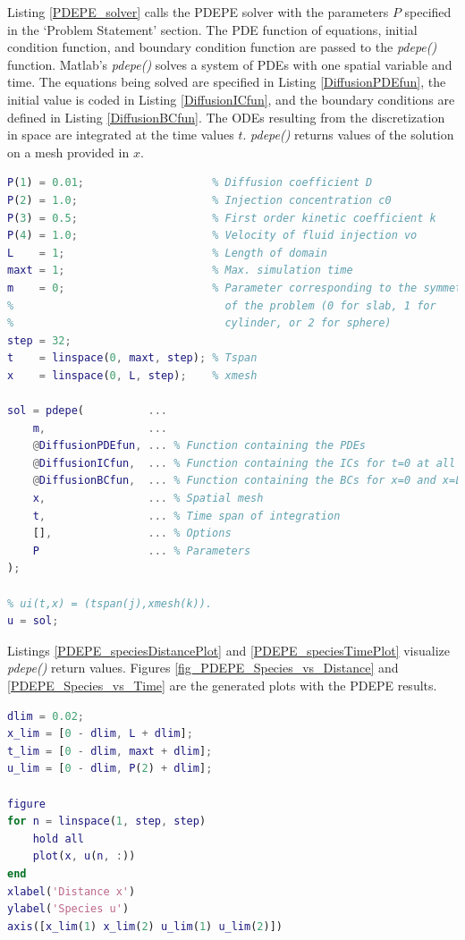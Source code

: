 \documentclass{article}
\begin{document}
Listing \ref{PDEPE_solver} calls the PDEPE solver with the parameters $P$ specified in the `Problem Statement' section. The PDE function of equations, initial condition function, and boundary condition function are passed to the \emph{pdepe()} function. Matlab's \emph{pdepe()} solves a system of PDEs with one spatial variable and time. The equations being solved are specified in Listing \ref{DiffusionPDEfun}, the initial value is coded in Listing \ref{DiffusionICfun}, and the boundary conditions are defined in Listing \ref{DiffusionBCfun}. The ODEs resulting from the discretization in space are integrated at the time values $t$. \emph{pdepe()} returns values of the solution on a mesh provided in $x$. 

\begin{lstlisting}[language=Matlab, caption=PDEPE solver, label=PDEPE_solver]
% Parameters
P(1) = 0.01;                    % Diffusion coefficient D
P(2) = 1.0;                     % Injection concentration c0
P(3) = 0.5;                     % First order kinetic coefficient k
P(4) = 1.0;                     % Velocity of fluid injection vo
L    = 1;                       % Length of domain
maxt = 1;                       % Max. simulation time
m    = 0;                       % Parameter corresponding to the symmetry
%                                 of the problem (0 for slab, 1 for
%                                 cylinder, or 2 for sphere)
step = 32;
t    = linspace(0, maxt, step); % Tspan
x    = linspace(0, L, step);    % xmesh

sol = pdepe(          ...
    m,                ...
    @DiffusionPDEfun, ... % Function containing the PDEs
    @DiffusionICfun,  ... % Function containing the ICs for t=0 at all x
    @DiffusionBCfun,  ... % Function containing the BCs for x=0 and x=L
    x,                ... % Spatial mesh
    t,                ... % Time span of integration
    [],               ... % Options
    P                 ... % Parameters
);

% ui(t,x) = (tspan(j),xmesh(k)).
u = sol;
\end{lstlisting}

Listings \ref{PDEPE_speciesDistancePlot} and \ref{PDEPE_speciesTimePlot} visualize \emph{pdepe()} return values. Figures \ref{fig_PDEPE_Species_vs_Distance} and \ref{PDEPE_Species_vs_Time} are the generated plots with the PDEPE results.

\begin{lstlisting}[language=Matlab, caption=PDEPE Distance vs. Species plot, label=PDEPE_speciesDistancePlot]
% plot limits
dlim = 0.02;
x_lim = [0 - dlim, L + dlim];
t_lim = [0 - dlim, maxt + dlim];
u_lim = [0 - dlim, P(2) + dlim];

figure
for n = linspace(1, step, step)
    hold all
    plot(x, u(n, :))
end
xlabel('Distance x')
ylabel('Species u')
axis([x_lim(1) x_lim(2) u_lim(1) u_lim(2)])
\end{lstlisting}
\end{document}
